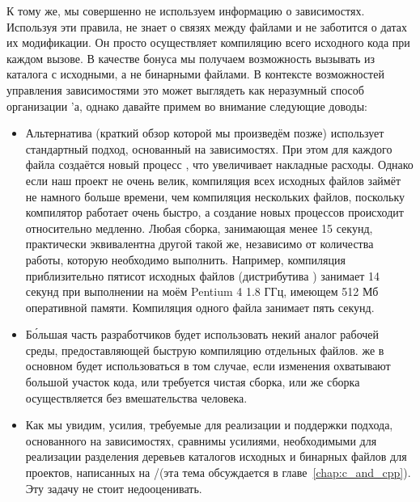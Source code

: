 К тому же, мы совершенно не используем информацию о зависимостях.
Используя эти правила, \GNUmake{} не знает о связях между файлами и не
заботится о датах их модификации. Он просто осуществляет компиляцию
всего исходного кода при каждом вызове. В качестве бонуса мы получаем
возможность вызывать \GNUmake{} из каталога с исходными, а не
бинарными файлами. В контексте возможностей управления зависимостями
\GNUmake{} это может выглядеть как неразумный способ организации
\Makefile{}'а, однако давайте примем во внимание следующие доводы:

\begin{itemize}
\item Альтернатива (краткий обзор которой мы произведём позже)
использует стандартный подход, основанный на зависимостях. При этом
для каждого файла создаётся новый процесс , что
увеличивает накладные расходы. Однако если наш проект не очень велик,
компиляция всех исходных файлов займёт не намного больше времени, чем
компиляция нескольких файлов, поскольку компилятор 
работает очень быстро, а создание новых процессов происходит
относительно медленно. Любая сборка, занимающая менее 15 секунд,
практически эквивалентна другой такой же, независимо от количества
работы, которую необходимо выполнить. Например, компиляция
приблизительно пятисот исходных файлов  (дистрибутива )
занимает 14 секунд при выполнении на моём Pentium 4 1.8 ГГц, имеющем
512 Мб оперативной памяти. Компиляция одного файла занимает пять
секунд.
\item Б\'{о}льшая часть разработчиков будет использовать некий аналог
рабочей среды, предоставляющей быструю компиляцию отдельных файлов.
\Makefile{} же в основном будет использоваться в том случае, если
изменения охватывают большой участок кода, или требуется чистая
сборка, или же сборка осуществляется без вмешательства человека.
\item Как мы увидим, усилия, требуемые для реализации и поддержки
подхода, основанного на зависимостях, сравнимы усилиями, необходимыми
для реализации разделения деревьев каталогов исходных и бинарных
файлов для проектов, написанных на \Clang{}/\Cplusplus (эта тема
обсуждается в главе~\ref{chap:c_and_cpp}). Эту задачу не стоит
недооценивать.
\end{itemize}

